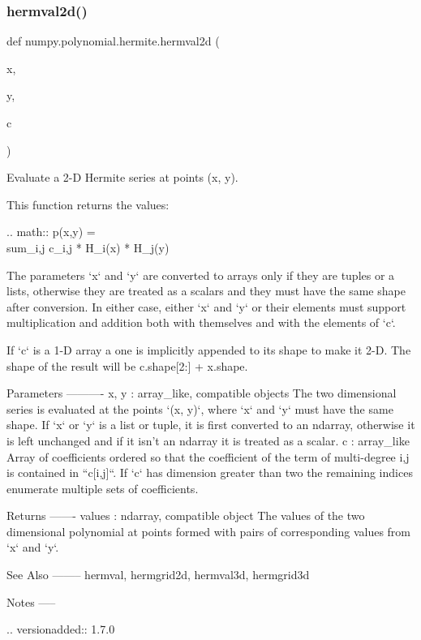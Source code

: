 \subsubsection{\texorpdfstring{hermval2d()}{hermval2d()}}
{\footnotesize\ttfamily def numpy.\+polynomial.\+hermite.\+hermval2d (\begin{DoxyParamCaption}\item[{}]{x,  }\item[{}]{y,  }\item[{}]{c }\end{DoxyParamCaption})}

\begin{DoxyVerb}Evaluate a 2-D Hermite series at points (x, y).

This function returns the values:

.. math:: p(x,y) = \\sum_{i,j} c_{i,j} * H_i(x) * H_j(y)

The parameters `x` and `y` are converted to arrays only if they are
tuples or a lists, otherwise they are treated as a scalars and they
must have the same shape after conversion. In either case, either `x`
and `y` or their elements must support multiplication and addition both
with themselves and with the elements of `c`.

If `c` is a 1-D array a one is implicitly appended to its shape to make
it 2-D. The shape of the result will be c.shape[2:] + x.shape.

Parameters
----------
x, y : array_like, compatible objects
    The two dimensional series is evaluated at the points `(x, y)`,
    where `x` and `y` must have the same shape. If `x` or `y` is a list
    or tuple, it is first converted to an ndarray, otherwise it is left
    unchanged and if it isn't an ndarray it is treated as a scalar.
c : array_like
    Array of coefficients ordered so that the coefficient of the term
    of multi-degree i,j is contained in ``c[i,j]``. If `c` has
    dimension greater than two the remaining indices enumerate multiple
    sets of coefficients.

Returns
-------
values : ndarray, compatible object
    The values of the two dimensional polynomial at points formed with
    pairs of corresponding values from `x` and `y`.

See Also
--------
hermval, hermgrid2d, hermval3d, hermgrid3d

Notes
-----

.. versionadded:: 1.7.0\end{DoxyVerb}
 \mbox{\label{namespacenumpy_1_1polynomial_1_1hermite_ae916c6cf200f5c89ae9ca5c3849e37ed}} 
